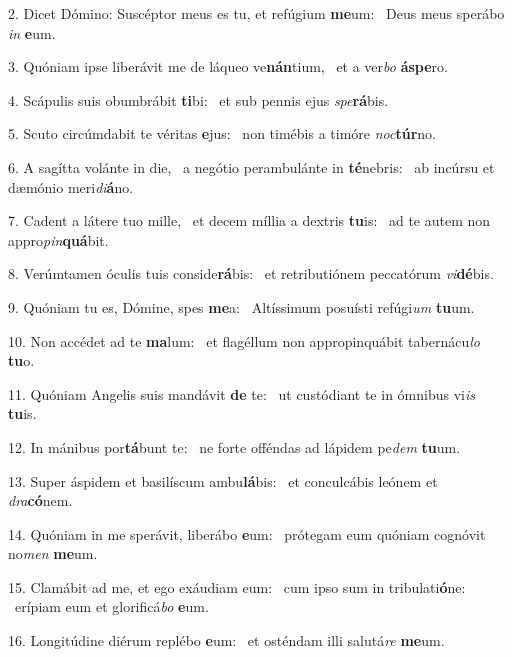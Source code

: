 2. Dicet Dómino: Suscéptor meus es tu, et refúgium \textbf{me}um: \ast\  Deus meus sperábo \textit{in} \textbf{e}um.\

3. Quóniam ipse liberávit me de láqueo ve\textbf{nán}tium, \ast\  et a ver\textit{bo} \textbf{ás}\textbf{pe}ro.\

4. Scápulis suis obumbrábit \textbf{ti}bi: \ast\  et sub pennis ejus \textit{spe}\textbf{rá}bis.\

5. Scuto circúmdabit te véritas \textbf{e}jus: \ast\  non timébis a timóre \textit{noc}\textbf{túr}no.\

6. A sagítta volánte in die, \dag\  a negótio perambulánte in \textbf{té}nebris: \ast\  ab incúrsu et dæmónio meri\textit{di}\textbf{á}no.\

7. Cadent a látere tuo mille, \dag\  et decem míllia a dextris \textbf{tu}is: \ast\  ad te autem non appro\textit{pin}\textbf{quá}bit.\

8. Verúmtamen óculis tuis conside\textbf{rá}bis: \ast\  et retributiónem peccatórum \textit{vi}\textbf{dé}bis.\

9. Quóniam tu es, Dómine, spes \textbf{me}a: \ast\  Altíssimum posuísti refúgi\textit{um} \textbf{tu}um.\

10. Non accédet ad te \textbf{ma}lum: \ast\  et flagéllum non appropinquábit tabernácu\textit{lo} \textbf{tu}o.\

11. Quóniam Angelis suis mandávit \textbf{de} te: \ast\  ut custódiant te in ómnibus vi\textit{is} \textbf{tu}is.\

12. In mánibus por\textbf{tá}bunt te: \ast\  ne forte offéndas ad lápidem pe\textit{dem} \textbf{tu}um.\

13. Super áspidem et basilíscum ambu\textbf{lá}bis: \ast\  et conculcábis leónem et \textit{dra}\textbf{có}nem.\

14. Quóniam in me sperávit, liberábo \textbf{e}um: \ast\  prótegam eum quóniam cognóvit no\textit{men} \textbf{me}um.\

15. Clamábit ad me, et ego exáudiam eum: \dag\  cum ipso sum in tribulati\textbf{ó}ne: \ast\  erípiam eum et glorificá\textit{bo} \textbf{e}um.\

16. Longitúdine diérum replébo \textbf{e}um: \ast\  et osténdam illi salutá\textit{re} \textbf{me}um.\

